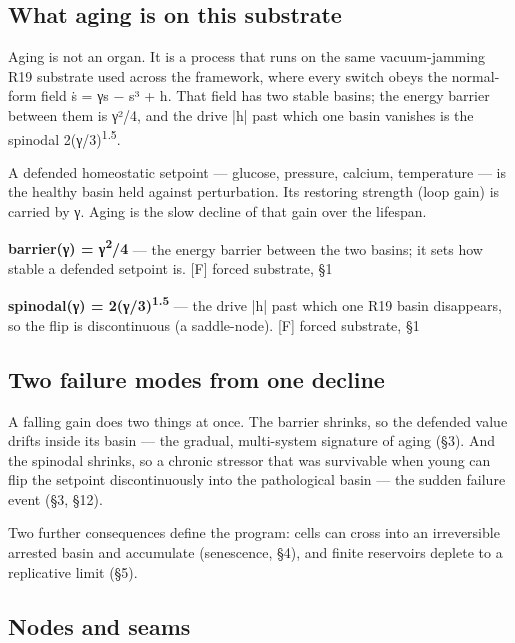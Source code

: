 \documentclass[11pt]{article}
\begin{document}
\subsection*{What aging is on this substrate}

Aging is not an organ. It is a process that runs on the same vacuum-jamming R19 substrate used across the framework, where every switch obeys the normal-form field ṡ = γs − s³ + h. That field has two stable basins; the energy barrier between them is γ²/4, and the drive |h| past which one basin vanishes is the spinodal 2(γ/3)\textsuperscript{1.5}.

A defended homeostatic setpoint — glucose, pressure, calcium, temperature — is the healthy basin held against perturbation. Its restoring strength (loop gain) is carried by γ. Aging is the slow decline of that gain over the lifespan.

\begin{vpbox}\textbf{barrier(γ) = γ\textsuperscript{2}/4} — the energy barrier between the two basins; it sets how stable a defended setpoint is. [F] forced substrate, §1\end{vpbox}

\begin{vpbox}\textbf{spinodal(γ) = 2(γ/3)\textsuperscript{1.5}} — the drive |h| past which one R19 basin disappears, so the flip is discontinuous (a saddle-node). [F] forced substrate, §1\end{vpbox}

\subsection*{Two failure modes from one decline}

A falling gain does two things at once. The barrier shrinks, so the defended value drifts inside its basin — the gradual, multi-system signature of aging (§3). And the spinodal shrinks, so a chronic stressor that was survivable when young can flip the setpoint discontinuously into the pathological basin — the sudden failure event (§3, §12).

Two further consequences define the program: cells can cross into an irreversible arrested basin and accumulate (senescence, §4), and finite reservoirs deplete to a replicative limit (§5).

\subsection*{Nodes and seams}
\end{document}
